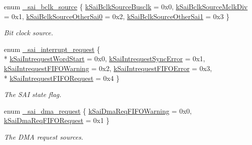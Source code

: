 \begin{DoxyCompactItemize}
\item 
enum \hyperlink{group__sai__hal_gae133d8e667ce98cdb9f7b3e4d60679ff}{\+\_\+sai\+\_\+bclk\+\_\+source} \{ \hyperlink{group__sai__hal_ggae133d8e667ce98cdb9f7b3e4d60679ffa5460a85c9b6f8a85e879c97a9e106bde}{k\+Sai\+Bclk\+Source\+Busclk} = 0x0, 
\hyperlink{group__sai__hal_ggae133d8e667ce98cdb9f7b3e4d60679ffa57a1a0ef5ed40f6797adb92f8da8233e}{k\+Sai\+Bclk\+Source\+Mclk\+Div} = 0x1, 
\hyperlink{group__sai__hal_ggae133d8e667ce98cdb9f7b3e4d60679ffa2a1f032b0be7178165c042e41f65be86}{k\+Sai\+Bclk\+Source\+Other\+Sai0} = 0x2, 
\hyperlink{group__sai__hal_ggae133d8e667ce98cdb9f7b3e4d60679ffa2ea9c460965d350f08fb3505733784fc}{k\+Sai\+Bclk\+Source\+Other\+Sai1} = 0x3
 \}\begin{DoxyCompactList}\small\item\em Bit clock source. \end{DoxyCompactList}
\item 
enum \hyperlink{group__sai__hal_ga85456b4cb780b26903bf8df1c5fa80e2}{\+\_\+sai\+\_\+interrupt\+\_\+request} \{ \\*
\hyperlink{group__sai__hal_gga85456b4cb780b26903bf8df1c5fa80e2a4906f59009323cb61a87f8f61d857391}{k\+Sai\+Intrequest\+Word\+Start} = 0x0, 
\hyperlink{group__sai__hal_gga85456b4cb780b26903bf8df1c5fa80e2ae76b7a797080a4e1099f65eebf8411e7}{k\+Sai\+Intrequest\+Sync\+Error} = 0x1, 
\hyperlink{group__sai__hal_gga85456b4cb780b26903bf8df1c5fa80e2a2a70fef81ce2974284c7fa28fe572815}{k\+Sai\+Intrequest\+F\+I\+F\+O\+Warning} = 0x2, 
\hyperlink{group__sai__hal_gga85456b4cb780b26903bf8df1c5fa80e2af61052d7d911f69f6719b9e7a8e93378}{k\+Sai\+Intrequest\+F\+I\+F\+O\+Error} = 0x3, 
\\*
\hyperlink{group__sai__hal_gga85456b4cb780b26903bf8df1c5fa80e2ab3a758e1733eb46674bc2d69a2505d5f}{k\+Sai\+Intrequest\+F\+I\+F\+O\+Request} = 0x4
 \}\begin{DoxyCompactList}\small\item\em The S\+AI state flag. \end{DoxyCompactList}
\item 
enum \hyperlink{group__sai__hal_gac39699ac34d770c6bc83dd2c92ecd9d9}{\+\_\+sai\+\_\+dma\+\_\+request} \{ \hyperlink{group__sai__hal_ggac39699ac34d770c6bc83dd2c92ecd9d9a2c312c7d231f552d4582a8ecaec087c9}{k\+Sai\+Dma\+Req\+F\+I\+F\+O\+Warning} = 0x0, 
\hyperlink{group__sai__hal_ggac39699ac34d770c6bc83dd2c92ecd9d9a8ab265e2dd4778b5a305e14e6dbb87dd}{k\+Sai\+Dma\+Req\+F\+I\+F\+O\+Request} = 0x1
 \}\begin{DoxyCompactList}\small\item\em The D\+MA request sources. \end{DoxyCompactList}

\end{DoxyCompactItemize}
